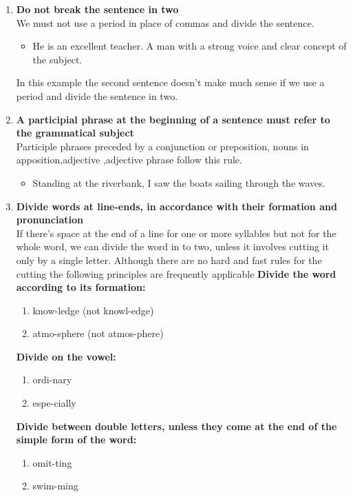 \documentclass{report}
\begin{document}
\begin{enumerate}
\item \textbf{Do not break the sentence in two}\\
We must not use a period in place of commas and divide the sentence.
\begin{itemize}
	\item He is an excellent teacher. A man with a strong voice and clear concept of the subject.
\end{itemize}
In this example the second sentence doesn't make much sense if we use a period and divide the sentence in two.

\item \textbf{A participial phrase at the beginning of a sentence must refer to the grammatical subject}\\
Participle phrases preceded by a conjunction or preposition, nouns in apposition,adjective ,adjective phrase follow this rule.
\begin{itemize}
	\item Standing at the riverbank, I saw the boats sailing through the waves.
\end{itemize}

\item \textbf{Divide words at line-ends, in accordance with their formation and pronunciation }\\
If there's space at the end of a line for one or more syllables but not for the whole word, we can divide the word in to two, unless it involves cutting it only by a single letter. Although there are no hard and fast rules for the cutting the following principles are frequently applicable
\textbf{Divide the word according to its formation: }\\
	\begin{enumerate}
		\item know-ledge (not knowl-edge)
		\item atmo-sphere  (not atmos-phere)
	\end{enumerate}
\textbf{Divide on the vowel: }\\
	\begin{enumerate}
		\item ordi-nary 
		\item espe-cially
	\end{enumerate}
\textbf{Divide between double letters, unless they come at the
	end of the simple form of the word: }\\
	\begin{enumerate}
		\item omit-ting 
		\item swim-ming
	\end{enumerate}
\end{enumerate}
\end{document}
